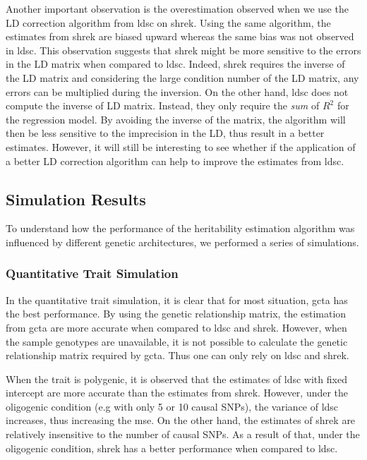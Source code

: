 \documentclass[12pt]{scrbook}
\begin{document}
Another important observation is the overestimation observed when we use the \gls{LD} correction algorithm from \gls{ldsc} on \gls{shrek}. 
Using the same algorithm, the estimates from \gls{shrek} are biased upward whereas the same bias was not observed in \gls{ldsc}.
This observation suggests that \gls{shrek} might be more sensitive to the errors in the \gls{LD} matrix when compared to \gls{ldsc}.
Indeed, \gls{shrek} requires the inverse of the \gls{LD} matrix and considering the large condition number of the \gls{LD} matrix, any errors can be multiplied during the inversion.
On the other hand, \gls{ldsc} does not compute the inverse of \gls{LD} matrix.
Instead, they only require the \emph{sum} of $R^2$ for the regression model.
By avoiding the inverse of the matrix, the algorithm will then be less sensitive to the imprecision in the \gls{LD}, thus result in a better estimates.
However, it will still be interesting to see whether if the application of a better \gls{LD} correction algorithm can help to improve the estimates from \gls{ldsc}.


\subsection{Simulation Results}
To understand how the performance of the heritability estimation algorithm was influenced by different genetic architectures, we performed a series of simulations.

\subsubsection{Quantitative Trait Simulation}
In the quantitative trait simulation, it is clear that for most situation, \gls{gcta} has the best performance.
By using the genetic relationship matrix, the estimation from \gls{gcta} are more accurate when compared to \gls{ldsc} and \gls{shrek}.
However, when the sample genotypes are unavailable, it is not possible to calculate the genetic relationship matrix required by \gls{gcta}. 
Thus one can only rely on \gls{ldsc} and \gls{shrek}.

When the trait is polygenic, it is observed that the estimates of \gls{ldsc} with fixed intercept are more accurate than the estimates from \gls{shrek}. 
However, under the oligogenic condition (e.g with only 5 or 10 causal \glspl{SNP}), the variance of \gls{ldsc} increases, thus increasing the \gls{mse}.
On the other hand, the estimates of \gls{shrek} are relatively insensitive to the number of causal \glspl{SNP}.
As a result of that, under the oligogenic condition, \gls{shrek} has a better performance when compared to \gls{ldsc}.
\end{document}
